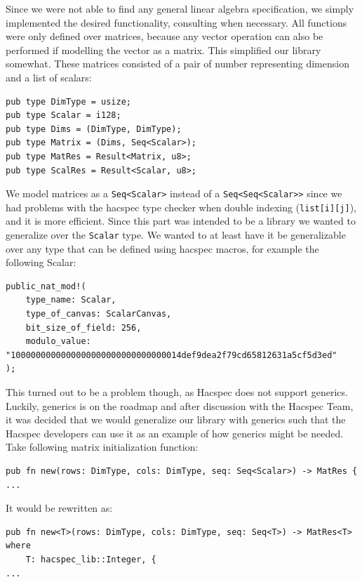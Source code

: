 \documentclass{article}
\begin{document}
Since we were not able to find any general linear algebra
specification, we simply implemented the desired functionality,
consulting \cite{linear-algebra} when necessary. All functions were
only defined over matrices, because any vector operation can also
be performed if modelling the vector as a matrix. This simplified
our library somewhat. These matrices consisted of a pair of number
representing dimension and a list of scalars:

\begin{lstlisting}
pub type DimType = usize;
pub type Scalar = i128;
pub type Dims = (DimType, DimType);
pub type Matrix = (Dims, Seq<Scalar>);
pub type MatRes = Result<Matrix, u8>;
pub type ScalRes = Result<Scalar, u8>;
\end{lstlisting}

We model matrices as a \texttt{Seq<Scalar>} instead of a
\texttt{Seq<Seq<Scalar>>} since we had problems with the hacspec type
checker when double indexing (\texttt{list[i][j]}), and it is more
efficient. Since this part was intended to be a library we wanted
to generalize over the \texttt{Scalar} type. We wanted to at least have it be generalizable over any type that can be defined using hacspec macros, for example the following Scalar:

\begin{lstlisting}
public_nat_mod!(
    type_name: Scalar,
    type_of_canvas: ScalarCanvas,
    bit_size_of_field: 256,
    modulo_value: "1000000000000000000000000000000014def9dea2f79cd65812631a5cf5d3ed"
);
\end{lstlisting}

This turned out to
be a problem though, as Hacspec does not support generics. Luckily,
generics is on the roadmap and after discussion with the Hacspec Team,
it was decided that we would generalize our library with generics such
that the Hacspec developers can use it as an example of how generics
might be needed. Take following matrix initialization function:

\begin{lstlisting}
pub fn new(rows: DimType, cols: DimType, seq: Seq<Scalar>) -> MatRes {
...
\end{lstlisting}

It would be rewritten as:

\begin{lstlisting}
pub fn new<T>(rows: DimType, cols: DimType, seq: Seq<T>) -> MatRes<T>
where
    T: hacspec_lib::Integer, {
...
\end{lstlisting}
\end{document}
